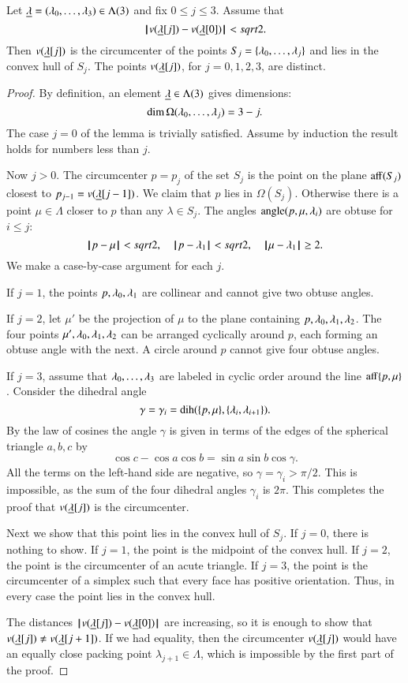 \begin{lemma}\label{lemma:v2} Let ${\underline{\lambda}}=(\lambda_0,\ldots,\lambda_3)\in\Lambda(3)$ and fix $0\le j\le 3$.  Assume that
$$
{\hskip0.1em|\hskip-0.15em|\hskip0.1em}v({\underline{\lambda}}[j])  -  v({\underline{\lambda}}[0]){\hskip0.1em|\hskip-0.15em|\hskip0.1em} < sqrt2.
$$
Then $v({\underline{\lambda}}[j])$ is the circumcenter of the points $S_j =\{\lambda_0,\ldots,\lambda_j\}$ and
lies in the convex hull of $S_j$.  The points $v({\underline{\lambda}}[j])$, for $j=0,1,2,3$, are distinct.
\end{lemma}

\begin{proof} By definition, an element ${\underline{\lambda}}\in\Lambda(3)$ gives dimensions: 
$$\dim\Omega(\lambda_0,\ldots,\lambda_j) = 3-j.$$  The case $j=0$ of the lemma is trivially
satisfied.  Assume by induction the result holds for numbers less than $j$.

Now $j>0$.
The circumcenter $p=p_{j}$ of the set $S_{j}$ is the point on the plane ${\operatorname{aff}}(S_{j})$
closest to $p_{j-1}=v({\underline{\lambda}}[j-1])$.  We claim that $p$ lies in $\Omega(S_{j})$.  Otherwise
there is a point $\mu\in\Lambda$ closer to $p$ than any $\lambda\in S_{j}$.  
The angles ${{\operatorname{angle}}(p,{\mu,\lambda_i})}$ are obtuse for $i\le j$:
$$
{\hskip0.1em|\hskip-0.15em|\hskip0.1em}p - \mu{\hskip0.1em|\hskip-0.15em|\hskip0.1em} < sqrt2,\quad {\hskip0.1em|\hskip-0.15em|\hskip0.1em}p - \lambda_1{\hskip0.1em|\hskip-0.15em|\hskip0.1em} <sqrt2,\quad {\hskip0.1em|\hskip-0.15em|\hskip0.1em}\mu - \lambda_1{\hskip0.1em|\hskip-0.15em|\hskip0.1em} \ge 2.
$$  
We make a case-by-case
argument for each $j$.

If $j=1$, the points $p,\lambda_0,\lambda_1$ are collinear and cannot give two obtuse angles.

If $j=2$, let $\mu'$ be the projection of $\mu$ to the plane containing
$p,\lambda_0,\lambda_1,\lambda_2$. The four points $\mu',\lambda_0,\lambda_1,\lambda_2$ can be arranged
cyclically around $p$, each forming an obtuse angle with the next.  A circle around $p$
cannot give four obtuse angles.


If $j=3$, assume that $\lambda_0,\ldots,\lambda_3$ are labeled in cyclic order around the line
${\operatorname{aff}}\{p,\mu\}$.  Consider the dihedral angle 
  $$
  \gamma=\gamma_i=\operatorname{dih}(\{p,\mu\},\{\lambda_i,\lambda_{i+1}\}).
  $$
By the law of cosines the angle $\gamma$ is given in terms of the edges of the spherical
triangle $a,b,c$ by
$$
  \cos c - \cos a \cos b = \sin a \sin b \cos \gamma.
$$
All the terms on the left-hand side are negative, so $\gamma =\gamma_i > \pi/2$.
This is impossible, as the sum of the four dihedral angles $\gamma_i$ is $2\pi$.
This completes the proof that $v({\underline{\lambda}}[j])$ is the circumcenter.

Next we show that this point lies in the convex hull of $S_j$.
If $j=0$, there is nothing to show.  If $j=1$, the point is the midpoint of the convex hull.
If $j=2$, the point is the circumcenter of an acute triangle.  If $j=3$, the point is the
circumcenter of a simplex such that every face has positive orientation.  Thus,
in every case the point lies in the convex hull.

The distances ${\hskip0.1em|\hskip-0.15em|\hskip0.1em}v({\underline{\lambda}}[j]) - v({\underline{\lambda}}[0]){\hskip0.1em|\hskip-0.15em|\hskip0.1em}$ are increasing, so it is enough to show
that $v({\underline{\lambda}}[j])\ne v({\underline{\lambda}}[j+1])$.  If we had equality, then the circumcenter $v({\underline{\lambda}}[j])$
would have an equally close packing point $\lambda_{j+1}\in\Lambda$, which is impossible by the first part of the proof.
\end{proof}

